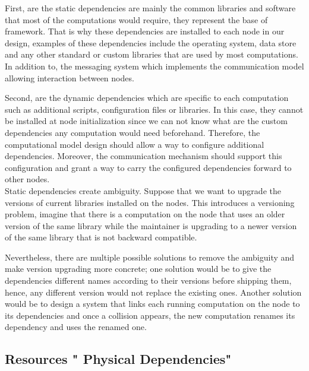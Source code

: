 First, are the static dependencies are mainly the common libraries and software that most of the computations would require, they represent the base of framework. That is why these dependencies are installed to each node in our design, examples of these dependencies include the operating system, data store and any other standard or custom libraries that are used by most computations. In addition to, the messaging system which implements the communication model allowing interaction between nodes. 

Second, are the dynamic dependencies which are specific to each computation such as additional scripts, configuration files or libraries. In this case, they cannot be installed at node initialization since we can not know what are the custom dependencies any computation would need beforehand. Therefore, the computational model design should allow a way to configure additional dependencies. Moreover, the communication mechanism should support this configuration and grant a way to carry the configured dependencies forward to other nodes.\\
 
 
\noindent Static dependencies create ambiguity. Suppose that we want to upgrade the versions of current libraries installed on the nodes. This introduces a  versioning problem, imagine that there is a computation on the node that uses an older version of the same library while the maintainer is upgrading to a newer version of the same library that is not backward compatible. 
  
Nevertheless, there are multiple possible solutions to remove the ambiguity and make  version upgrading more concrete; one solution would be to give the dependencies different names according to their versions before shipping them, hence, any different version would not replace the existing ones. Another solution would be to design a system that links each running computation on the node to its dependencies and once a collision appears, the new computation renames its dependency and uses the renamed one.
 

\subsection {Resources " Physical Dependencies" }


